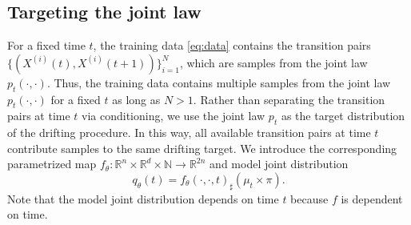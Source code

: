 \documentclass[oneside,11pt]{article}
\theoremstyle{remark}
\newcommand{\R}{\mathbb{R}}
\begin{document}
\subsection{Targeting the joint law}
For a fixed time $t$, the training data \eqref{eq:data} contains the transition pairs  $\{(X^{(i)}(t),X^{(i)}(t+1))\}_{i=1}^{N}$, which are samples from the joint law $p_t(\cdot,\cdot)$.
Thus, the training data contains multiple samples from the joint law $p_t(\cdot,\cdot)$ for a fixed $t$ as long as $N > 1$.
Rather than separating the transition pairs at time $t$ via conditioning, we use the joint law $p_t$ as the target distribution of the drifting procedure. In this way, all available
    transition pairs at time $t$ contribute samples to the same drifting target.
We introduce the corresponding parametrized map $
        f_\theta:
        \R^n\times\R^d\times\mathbb{N}
        \to
        \R^{2n}
    $
    and model joint distribution
\begin{equation}\label{eq:TargetJointatTheta}
        q_\theta(t)
        =
        f_\theta(\cdot,\cdot,t)_{\sharp}
        (\mu_t\times\pi).
    \end{equation}
    Note that the model joint distribution depends on time $t$ because $f$ is dependent on time. 

    
\end{document}
